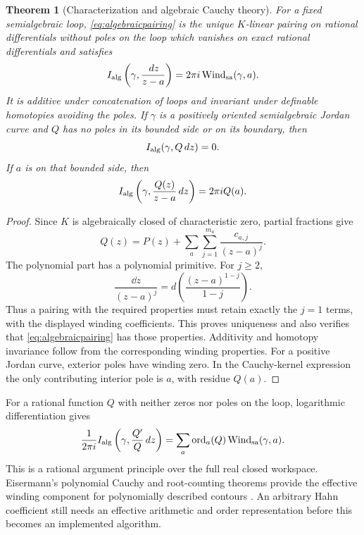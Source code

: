 \documentclass[11pt,letterpaper]{article}
\newtheorem{theorem}{Theorem}[section]
\theoremstyle{definition}
\theoremstyle{remark}
\newcommand{\ord}{\operatorname{ord}}\newcommand{\Tr}{\operatorname{Tr}}
\numberwithin{equation}{section}
\begin{document}
\begin{theorem}[Characterization and algebraic Cauchy theory]\label{thm:algpairing}
For a fixed semialgebraic loop, \eqref{eq:algebraicpairing} is the unique $K$-linear pairing on rational differentials without poles on the loop which vanishes on exact rational differentials and satisfies
\[
 I_{\rm alg}\left(\gamma,\frac{\,d z}{z-a}\right)
 =2\pi i\operatorname{Wind}_{\rm sa}(\gamma,a).
\]
It is additive under concatenation of loops and invariant under definable homotopies avoiding the poles. If $\gamma$ is a positively oriented semialgebraic Jordan curve and $Q$ has no poles in its bounded side or on its boundary, then
\[
 I_{\rm alg}(\gamma,Q\,d z)=0.
\]
If $a$ is on that bounded side, then
\[
 I_{\rm alg}\left(\gamma,\frac{Q(z)}{z-a}\,d z\right)=2\pi i Q(a).
\]
\end{theorem}
\begin{proof}
Since $K$ is algebraically closed of characteristic zero, partial fractions give
\[
 Q(z)=P(z)+\sum_a\sum_{j=1}^{m_a}\frac{c_{a,j}}{(z-a)^j}.
\]
The polynomial part has a polynomial primitive. For $j\ge2$,
\[
 \frac{\dd z}{(z-a)^j}
 =d\left(\frac{(z-a)^{1-j}}{1-j}\right).
\]
Thus a pairing with the required properties must retain exactly the $j=1$ terms, with the displayed winding coefficients. This proves uniqueness and also verifies that \eqref{eq:algebraicpairing} has those properties. Additivity and homotopy invariance follow from the corresponding winding properties. For a positive Jordan curve, exterior poles have winding zero. In the Cauchy-kernel expression the only contributing interior pole is $a$, with residue $Q(a)$.
\end{proof}

For a rational function $Q$ with neither zeros nor poles on the loop, logarithmic differentiation gives
\[
 \frac1{2\pi i}I_{\rm alg}\left(\gamma,\frac{Q'}Q\dd z\right)
 =\sum_a\ord_a(Q)\Wind_{\rm sa}(\gamma,a).
\]
This is a rational argument principle over the full real closed workspace. Eisermann's polynomial Cauchy and root-counting theorems provide the effective winding component for polynomially described contours \cite{Eisermann}. An arbitrary Hahn coefficient still needs an effective arithmetic and order representation before this becomes an implemented algorithm.
\end{document}
